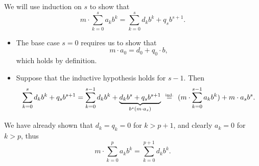 \begin{defproof}
  We will use induction on \( s \) to show that
  \begin{equation*}
    m \cdot \sum_{k=0}^s a_k b^k = \sum_{k=0}^s d_k b^k + q_s b^{s+1}.
  \end{equation*}

  \begin{itemize}
    \item The base case \( s = 0 \) requires us to show that
    \begin{equation*}
      m \cdot a_0 = d_0 + q_0 \cdot b,
    \end{equation*}
    which holds by definition.

    \item Suppose that the inductive hypothesis holds for \( s - 1 \). Then
    \begin{equation*}
      \sum_{k=0}^s d_k b^k + q_s b^{s+1}
      =
      \sum_{k=0}^{s-1} d_k b^k + \underbrace{d_k b^s + q_s b^{s+1}}_{b^s(m \cdot a_s)}
      \reloset{\T{ind.}} =
      (m \cdot \sum_{k=0}^{s-1} a_k b^k) + m \cdot a_s b^s.
    \end{equation*}
  \end{itemize}

  We have already shown that \( d_k = q_k = 0 \) for \( k > p + 1 \), and clearly \( a_k = 0 \) for \( k > p \), thus
  \begin{equation*}
    m \cdot \sum_{k=0}^p a_k b^k = \sum_{k=0}^{p + 1} d_k b^k.
  \end{equation*}
\end{defproof}

